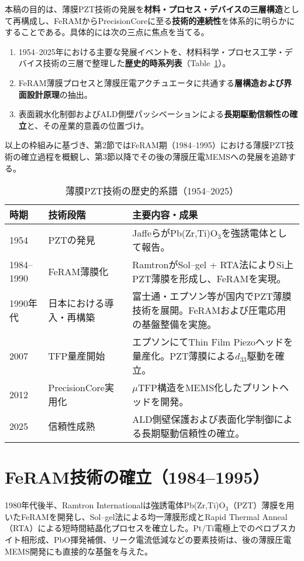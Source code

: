 \documentclass[conference]{IEEEtran}
\begin{document}
本稿の目的は、薄膜PZT技術の発展を\textbf{材料・プロセス・デバイスの三層構造}として再構成し、FeRAMからPrecisionCoreに至る\textbf{技術的連続性}を体系的に明らかにすることである。具体的には次の三点に焦点を当てる。
\begin{enumerate}
  \item 1954--2025年における主要な発展イベントを、材料科学・プロセス工学・デバイス技術の三層で整理した\textbf{歴史的時系列表}（Table~\ref{tab:timeline}）。
  \item FeRAM薄膜プロセスと薄膜圧電アクチュエータに共通する\textbf{層構造および界面設計原理}の抽出。
  \item 表面親水化制御およびALD側壁パッシベーションによる\textbf{長期駆動信頼性の確立}と、その産業的意義の位置づけ。
\end{enumerate}

\medskip
以上の枠組みに基づき、第2節ではFeRAM期（1984--1995）における薄膜PZT技術の確立過程を概観し、第3節以降でその後の薄膜圧電MEMSへの発展を追跡する。

\begin{table}[!t]
\centering
\caption{薄膜PZT技術の歴史的系譜（1954--2025）}
\label{tab:timeline}
\renewcommand{\arraystretch}{1.15}
\begin{tabular}{@{}llp{4.3cm}@{}}
\toprule
\textbf{時期} & \textbf{技術段階} & \textbf{主要内容・成果} \\ \midrule
1954 & PZTの発見 &
JaffeらがPb(Zr,Ti)O$_3$を強誘電体として報告\cite{jaffe1954}。 \\[2pt]
1984--1990 & FeRAM薄膜化 &
RamtronがSol--gel + RTA法によりSi上PZT薄膜を形成し、FeRAMを実現\cite{ramtron_iedm1989}。\\[2pt]
1990年代 & 日本における導入・再構築 &
富士通・エプソン等が国内でPZT薄膜技術を展開。FeRAMおよび圧電応用の基盤整備を実施。\\[2pt]
2007 & TFP量産開始 &
エプソンにてThin Film Piezoヘッドを量産化。PZT薄膜による$d_{33}$駆動を確立。\\[2pt]
2012 & PrecisionCore実用化 &
$\mu$TFP構造をMEMS化したプリントヘッドを開発\cite{uemura2014mems}。\\[2pt]
2025 & 信頼性成熟 &
ALD側壁保護および表面化学制御による長期駆動信頼性の確立。\\
\bottomrule
\end{tabular}
\end{table}

\section{FeRAM技術の確立（1984--1995）}
1980年代後半、Ramtron Internationalは強誘電体Pb(Zr,Ti)O$_3$（PZT）薄膜を用いたFeRAMを開発し、Sol--gel法による均一薄膜形成とRapid Thermal Anneal（RTA）による短時間結晶化プロセスを確立した\cite{ramtron_iedm1989,bottaro1993solgel}。Pt/Ti電極上でのペロブスカイト相形成、PbO揮発補償、リーク電流低減などの要素技術は、後の薄膜圧電MEMS開発にも直接的な基盤を与えた\cite{scott2000review}。
\end{document}
